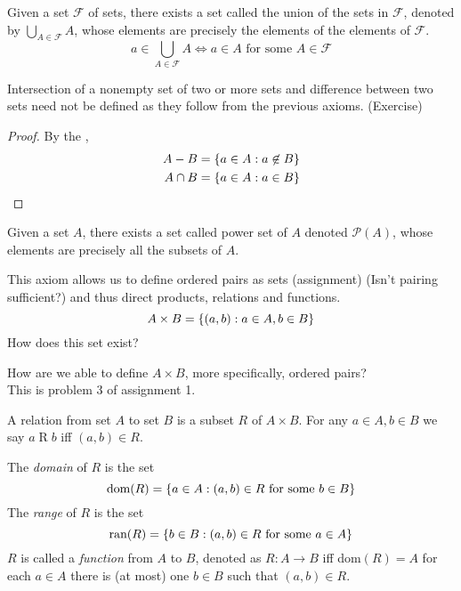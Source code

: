 \documentclass[12pt]{article}
\begin{document}
\begin{axiom} \label{zfc:unions}
    Given a set $\mathscr{F}$ of sets, there exists a set called the union of the sets in $\mathscr{F}$, denoted by $\bigcup_{A \in \mathscr{F}} A$, whose elements are precisely the elements of the elements of $\mathscr{F}$.
    \[
        a \in \bigcup_{A \in \mathscr{F}} A \iff a \in A \text{ for some } A \in \mathscr{F}
    \]
\end{axiom}

\begin{rem}
    Intersection of a nonempty set of two or more sets and difference between two sets need not be defined as they follow from the previous axioms. (Exercise)
\end{rem}

\begin{proof}
    By the ,
    \begin{align*}
        A - B &= \set{ a \in A : a \not\in B } \\
        A \cap B &= \set{ a \in A : a \in B } \qedhere
    \end{align*}
\end{proof}

\begin{axiom} \label{zfc:powers}
    Given a set $A$, there exists a set called power set of $A$ denoted $\mathscr{P}(A)$, whose elements are precisely all the subsets of $A$.   
\end{axiom}
\begin{rem}
    This axiom allows us to define ordered pairs as sets (assignment) (\textcolor{red!85!black}{Isn't pairing sufficient?}) and thus direct products, relations and functions. \[
        A \times B = \set{(a, b) : a \in A, b \in B}
    \] \textcolor{red!85!black}{How does this set exist?}
\end{rem}

\textcolor{red!85!black}{How are we able to define $A \times B$, more specifically, ordered pairs?} \\
\quad \textcolor{green!30!black}{This is problem 3 of assignment 1.} 

\begin{defn} \label{defn:relation}
    A relation from set $A$ to set $B$ is a subset $R$ of $A \times B$. For any $a \in A, b \in B$ we say $a\mathrel{R}b$ iff $(a, b) \in R$.
    \begin{outline}
        \1 The \emph{domain} of $R$ is the set
        \[
            \text{dom}(R) = \set{ a \in A : (a, b) \in R \text{ for some } b \in B}
        \]
        \1 The \emph{range} of $R$ is the set
        \[
            \text{ran}(R) = \set{ b \in B : (a, b) \in R \text{ for some } a \in A}
        \]
        \1 $R$ is called a \emph{function} from $A$ to $B$, denoted as $R: A \to B$ iff
            \2 dom$(R) = A$
            \2 for each $a \in A$ there is (at most) one $b \in B$ such that $(a, b) \in R$.
    \end{outline}
\end{defn}
\end{document}
